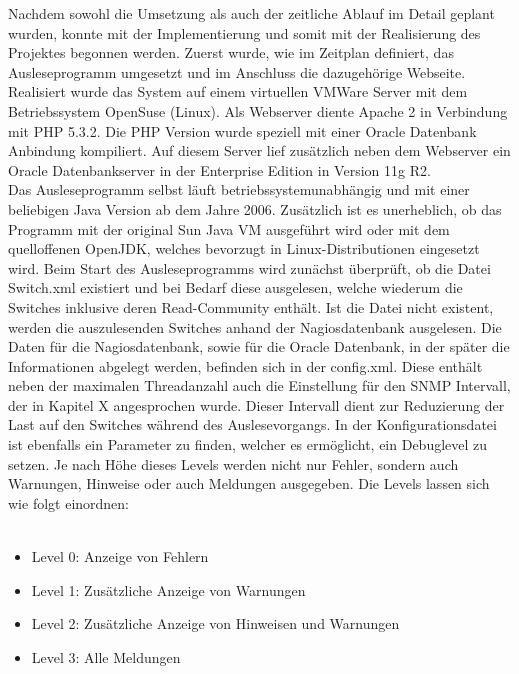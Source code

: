 Nachdem sowohl die Umsetzung als auch der zeitliche Ablauf im Detail geplant wurden, konnte mit der Implementierung und somit mit der Realisierung des Projektes begonnen werden.
Zuerst wurde, wie im Zeitplan definiert, das Ausleseprogramm umgesetzt und im Anschluss die dazugehörige Webseite.\\
Realisiert wurde das System auf einem virtuellen VMWare Server mit dem Betriebssystem OpenSuse (Linux). Als Webserver diente Apache 2 in Verbindung mit PHP 5.3.2. Die PHP Version wurde speziell mit einer Oracle Datenbank Anbindung kompiliert.
Auf diesem Server lief zusätzlich neben dem Webserver ein Oracle Datenbankserver in der Enterprise Edition in Version 11g R2.\\
Das Ausleseprogramm selbst läuft betriebssystemunabhängig und mit einer beliebigen Java Version ab dem Jahre 2006. Zusätzlich ist es unerheblich, ob das Programm mit der original Sun Java VM ausgeführt wird oder mit dem quelloffenen OpenJDK, welches bevorzugt in Linux-Distributionen eingesetzt wird.
Beim Start des Ausleseprogramms wird zunächst überprüft, ob die Datei Switch.xml existiert und bei Bedarf diese ausgelesen, welche wiederum die Switches inklusive deren Read-Community enthält. Ist die Datei nicht existent, werden die auszulesenden Switches anhand der Nagiosdatenbank ausgelesen. Die Daten für die Nagiosdatenbank, sowie für die Oracle Datenbank, in der später die Informationen abgelegt werden, befinden sich in der config.xml.
Diese enthält neben der maximalen Threadanzahl auch die Einstellung für den SNMP Intervall, der in Kapitel X angesprochen wurde.
Dieser Intervall dient zur Reduzierung der Last auf den Switches während des Auslesevorgangs.
In der Konfigurationsdatei ist ebenfalls ein Parameter zu finden, welcher es ermöglicht, ein Debuglevel zu setzen.
Je nach Höhe dieses Levels werden nicht nur Fehler, sondern auch Warnungen, Hinweise oder auch Meldungen ausgegeben.
Die Levels lassen sich wie folgt einordnen:\\
\\
\begin{itemize}
\item Level 0: Anzeige von Fehlern\\
\item Level 1: Zusätzliche Anzeige von Warnungen\\
\item Level 2: Zusätzliche Anzeige von Hinweisen und Warnungen\\
\item Level 3: Alle Meldungen\\
\end{itemize}


